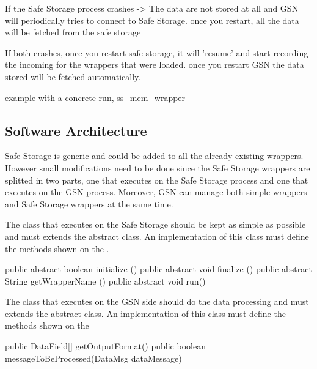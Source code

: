 If the Safe Storage process crashes -> The data are not stored at all and GSN will periodically tries to connect to Safe Storage.
once you restart, all the data will be fetched from the safe storage

If both crashes, once you restart safe storage, it will 'resume' and start recording the incoming for the wrappers that were loaded.
once you restart GSN the data stored will be fetched automatically.

example with a concrete run, ss\_mem\_wrapper



\subsection{Software Architecture}

Safe Storage is generic and could be added to all the already existing wrappers. However small modifications need to be done since the
Safe Storage wrappers are splitted in two parts, one that executes on the Safe Storage process and one that executes on the GSN process.
Moreover, GSN can manage both simple wrappers and Safe Storage wrappers at the same time.

The class that executes on the Safe Storage should be kept as simple as possible and must extends the
 abstract class.
An implementation of this class must define the methods shown on the .

\begin{javacode}[caption={Methods to implement for a Safe Storage Wrapper - Safe Storage Side}, label=listing:java:safestorage_methods_to_implement]
public abstract boolean initialize ()
public abstract void finalize ()
public abstract String getWrapperName () 
public abstract void run()
\end{javacode}

The class that executes on the GSN side should do the data processing and must extends the 
 abstract class.
An implementation of this class must define the methods shown on the 

\begin{javacode}[caption={Methods to implement for a Safe Storage Wrapper - GSN Side}, label=listing:java:safestorage_gsn_methods_to_implement]
public DataField[] getOutputFormat()
public boolean messageToBeProcessed(DataMsg dataMessage)
\end{javacode}

